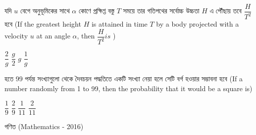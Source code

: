 \documentclass[addpoints]{exam}
\begin{document}
\begin{questions}
\begin{oneparchoices}
\end{oneparchoices}

\question   যদি $ u $ বেগে অনুভূমিকের সাথে $ \alpha $ কোণে প্রক্ষিপ্ত বস্তু $ T $ সময়ে তার গতিপথের সর্বোচ্চ উচ্চতা $ H $ এ পৌঁছায় তবে $ \dfrac{H}{T^2} $ হবে (If the greatest height $ H $ is attained in time $ T $ by a body projected with  a velocity $ u $ at an angle $ \alpha $, then $ \dfrac{H}{T^2} is $  )

\begin{oneparchoices}
\choice $ \dfrac{2}{g} $
\choice $ \dfrac{g}{2} $
\choice $ g $
\choice $ \dfrac{1}{g} $

\end{oneparchoices}

  হতে 99 পর্যন্ত সংখ্যাগুলো থেকে দৈবচয়ন পদ্ধতিতে একটি সংখ্যা নেয়া হলে সেটি বর্গ হওয়ার সম্ভাবনা হবে (If a number randomly from 1 to 99, then the probability that it would be a square is) 

\begin{oneparchoices}
\choice $ \dfrac{1}{9} $
\choice $ \dfrac{2}{9} $
\choice $ \dfrac{1}{11} $
\choice $ \dfrac{2}{11} $

\end{oneparchoices}

\end{questions}
\begin{LARGE}
\begin{center}
গণিত (Mathematics - 2016)
\end{center}
\end{LARGE}
\end{document}
